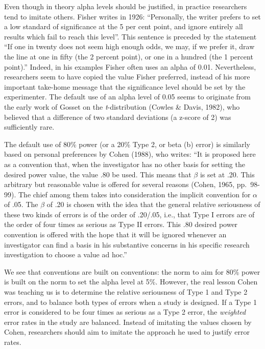 \documentclass[
  english,
  ,jou,floatsintext]{apa6}
\begin{document}
Even though in theory alpha levels should be justified, in practice researchers tend to imitate others. Fisher writes in 1926: ``Personally, the writer prefers to set a low standard of significance at the 5 per cent point, and ignore entirely all results which fail to reach this level''. This sentence is preceded by the statement ``If one in twenty does not seem high enough odds, we may, if we prefer it, draw the line at one in fifty (the 2 percent point), or one in a hundred (the 1 percent point).'' Indeed, in his examples Fisher often uses an alpha of 0.01. Nevertheless, researchers seem to have copied the value Fisher preferred, instead of his more important take-home message that the significance level should be set by the experimenter. The default use of an alpha level of 0.05 seems to originate from the early work of Gosset on the \emph{t}-distribution (Cowles \& Davis, 1982), who believed that a difference of two standard deviations (a z-score of 2) was sufficiently rare.

The default use of 80\% power (or a 20\% Type 2, or beta (b) error) is similarly based on personal preferences by Cohen (1988), who writes: ``It is proposed here as a convention that, when the investigator has no other basis for setting the desired power value, the value .80 be used. This means that \(\beta\) is set at .20. This arbitrary but reasonable value is offered for several reasons (Cohen, 1965, pp.~98-99). The chief among them takes into consideration the implicit convention for \(\alpha\) of .05. The \(\beta\) of .20 is chosen with the idea that the general relative seriousness of these two kinds of errors is of the order of .20/.05, i.e., that Type I errors are of the order of four times as serious as Type II errors. This .80 desired power convention is offered with the hope that it will be ignored whenever an investigator can find a basis in his substantive concerns in his specific research investigation to choose a value ad hoc.''

We see that conventions are built on conventions: the norm to aim for 80\% power is built on the norm to set the alpha level at 5\%. However, the real lesson Cohen was teaching us is to determine the relative seriousness of Type 1 and Type 2 errors, and to balance both types of errors when a study is designed. If a Type 1 error is considered to be four times as serious as a Type 2 error, the \emph{weighted} error rates in the study are balanced. Instead of imitating the values chosen by Cohen, researchers should aim to imitate the approach he used to justify error rates.
\end{document}

